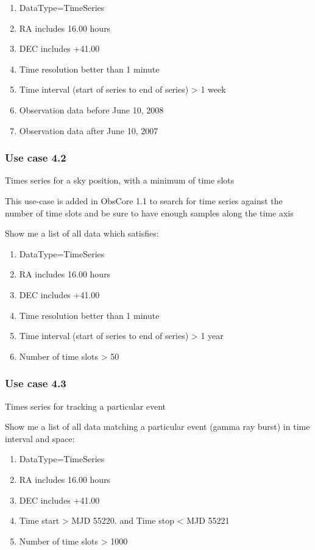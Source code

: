 \documentclass[11pt,a4paper]{ivoa}
\begin{document}
\begin{enumerate}
\item DataType=TimeSeries
\item RA includes 16.00 hours
\item DEC includes +41.00
\item Time resolution better than 1 minute
\item Time interval (start of series to end of series) {\textgreater} 1 week
\item Observation data before June 10, 2008
\item Observation data after June 10, 2007
\end{enumerate}

\subsubsection{Use case 4.2}
Times series for a sky position, with a minimum of time slots

This use-case is added in ObsCore 1.1 to search for time series against the number of time slots and be sure to have
enough samples along the time axis

Show me a list of all data which satisfies:

\begin{enumerate}
\item DataType=TimeSeries
\item RA includes 16.00 hours
\item DEC includes +41.00
\item Time resolution better than 1 minute
\item Time interval (start of series to end of series) {\textgreater} 1 year
\item Number of time slots {\textgreater} 50
\end{enumerate}

\subsubsection{Use case 4.3}
Times series for tracking a particular event

Show me a list of all data matching a particular event (gamma ray burst) in time interval and space:

\begin{enumerate}
\item DataType=TimeSeries
\item RA includes 16.00 hours
\item DEC includes +41.00
\item Time start {\textgreater} MJD 55220. and Time stop {\textless} MJD 55221
\item Number of time slots {\textgreater} 1000
\end{enumerate}
\end{document}
